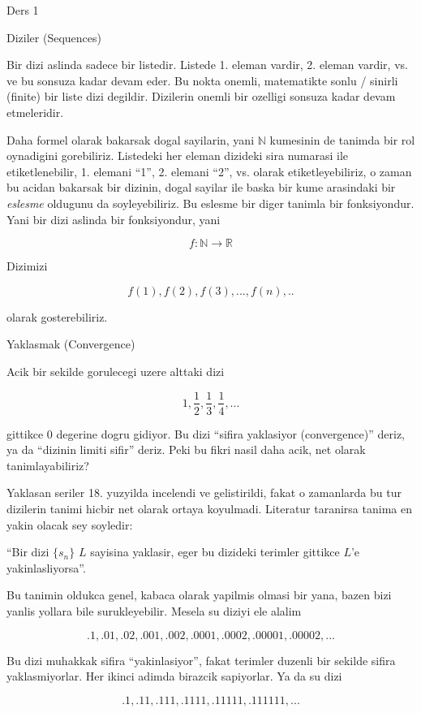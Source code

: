 \documentclass[12pt,fleqn]{article}
\begin{document}
Ders 1 

Diziler (Sequences)

Bir dizi aslinda sadece bir listedir. Listede 1. eleman vardir, 2. eleman
vardir, vs. ve bu sonsuza kadar devam eder. Bu nokta onemli, matematikte
sonlu / sinirli (finite) bir liste dizi degildir. Dizilerin onemli bir
ozelligi sonsuza kadar devam etmeleridir. 

Daha formel olarak bakarsak dogal sayilarin, yani $\mathbb{N}$ kumesinin de
tanimda bir rol oynadigini gorebiliriz. Listedeki her eleman dizideki sira
numarasi ile etiketlenebilir, 1. elemani ``1'', 2. elemani ``2'',
vs. olarak etiketleyebiliriz, o zaman bu acidan bakarsak bir dizinin, dogal
sayilar ile baska bir kume arasindaki bir {\em eslesme} oldugunu da
soyleyebiliriz. Bu eslesme bir diger tanimla bir fonksiyondur. Yani bir
dizi aslinda bir fonksiyondur, yani 

\[ f: \mathbb{N} \to \mathbb{R} \]

Dizimizi 

\[ f(1),f(2),f(3),...,f(n),.. \]

olarak gosterebiliriz. 

Yaklasmak (Convergence) 

Acik bir sekilde gorulecegi uzere alttaki dizi

\[ 1,\frac{1}{2},\frac{1}{3},\frac{1}{4},... \]

gittikce 0 degerine dogru gidiyor. Bu dizi ``sifira yaklasiyor
(convergence)'' deriz, ya da ``dizinin limiti sifir'' deriz. Peki bu fikri
nasil daha acik, net olarak tanimlayabiliriz? 

Yaklasan seriler 18. yuzyilda incelendi ve gelistirildi, fakat o zamanlarda
bu tur dizilerin tanimi hicbir net olarak ortaya koyulmadi. Literatur
taranirsa tanima en yakin olacak sey soyledir:

``Bir dizi $\{s_n\}$ $L$ sayisina yaklasir, eger bu dizideki terimler
gittikce $L$'e yakinlasliyorsa''. 

Bu tanimin oldukca genel, kabaca olarak yapilmis olmasi bir yana, bazen
bizi yanlis yollara bile surukleyebilir. Mesela su diziyi ele alalim 

\[ .1, .01, .02, .001, .002, .0001, .0002, .00001, .00002, ... \]

Bu dizi muhakkak sifira ``yakinlasiyor'', fakat terimler duzenli bir sekilde
sifira yaklasmiyorlar. Her ikinci adimda birazcik sapiyorlar. Ya da su dizi

\[ .1, .11, .111, .1111, .11111, .111111, ... \]
\end{document}
